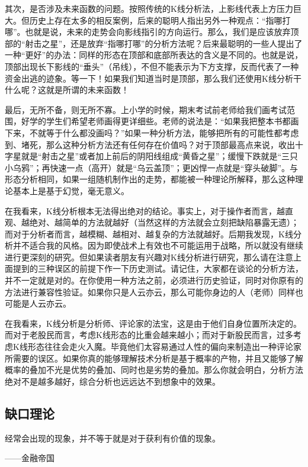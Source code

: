 其次，是否涉及未来函数的问题。按照传统的K线分析法，上影线代表上方压力巨大。但历史上存在太多的相反案例，后来的聪明人指出另外一种观点：“指哪打哪”。也就是说，未来的走势会向影线指引的方向运行。那么，我们是应该放弃顶部的“射击之星”，还是放弃“指哪打哪”的分析方法呢？后来最聪明的一些人提出了一种“更好”的办法：同样的形态在顶部和底部所表达的含义是不同的。也就是说，顶部出现长下影线的“垂头”（吊线），不但不能表示为下方支撑，反而代表了一种资金出逃的迹象。等一下！如果我们知道当时是顶部，那么我们还使用K线分析干什么呢？这就是所谓的未来函数！

最后，无所不备，则无所不寡。上小学的时候，期末考试前老师给我们画考试范围，好学的学生们希望老师画得更详细些。老师的说法是：“如果我把整本书都画下来，不就等于什么都没画吗？”如果一种分析方法，能够把所有的可能性都考虑到、堵死，那么这种分析方法还有任何存在价值吗？对于顶部最高点来说，收出十字星就是“射击之星”或者加上前后的阴阳线组成“黄昏之星”；缓慢下跌就是“三只小乌鸦”；再快速一点（高开）就是“乌云盖顶”；更凶悍一点就是“穿头破脚”。与形态分析相同，如果一组随机制作出的走势，都能被一种理论所解释，那么这种理论基本上是基于幻觉，毫无意义。

在我看来，K线分析根本无法得出绝对的结论。事实上，对于操作者而言，越直观、越绝对、越简单的方法就越好（当然这样的方法就会立刻把缺陷暴露无遗）；而对于分析者而言，越模糊、越相对、越复杂的方法就越好。后期我发现，K线分析并不适合我的风格。因为即使战术上有效也不可能运用于战略，所以就没有继续进行更深刻的研究。但如果读者朋友有兴趣对K线分析进行研究，那么请在注意上面提到的三种误区的前提下作一下历史测试。请记住，大家都在谈论的分析方法，并不一定就是对的。在你使用一种方法之前，必须进行历史验证，同时对你原有的方法进行兼容性验证。如果你只是人云亦云，那么可能你身边的人（老师）同样也可能是人云亦云。

在我看来，K线分析是分析师、评论家的法宝，这是由于他们自身位置所决定的。而对于老股民而言，考虑K线形态的比重会越来越小；而对于新股民而言，过多考虑K线形态往往会走火入魔。毕竟他们太容易通过人性的偏向来制造出一种评论家所需要的误区。如果你真的能够理解技术分析是基于概率的产物，并且又能够了解概率的叠加不光是优势的叠加、同时也是劣势的叠加。那么你就会明白，分析方法绝对不是越多越好，综合分析也远远达不到想象中的效果。

\subsection{缺口理论}

{\kaishu
经常会出现的现象，并不等于就是对于获利有价值的现象。

\hfill ——金融帝国
}

